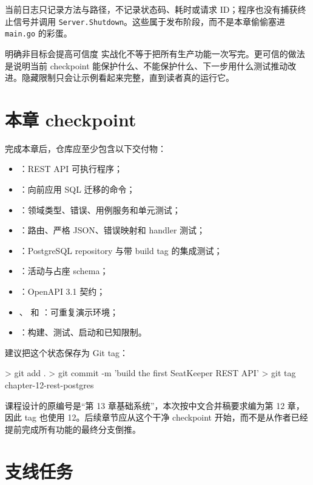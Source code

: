 当前日志只记录方法与路径，不记录状态码、耗时或请求 ID；程序也没有捕获终止信号并调用 \texttt{Server.Shutdown}。这些属于发布阶段，而不是本章偷偷塞进 \texttt{main.go} 的彩蛋。

\begin{tipbox}{明确非目标会提高可信度}
实战化不等于把所有生产功能一次写完。更可信的做法是说明当前 checkpoint 能保护什么、不能保护什么、下一步用什么测试推动改进。隐藏限制只会让示例看起来完整，直到读者真的运行它。
\end{tipbox}

\section{本章 checkpoint}

完成本章后，仓库应至少包含以下交付物：

\begin{itemize}
  \item {}：REST API 可执行程序；
  \item {}：向前应用 SQL 迁移的命令；
  \item {}：领域类型、错误、用例服务和单元测试；
  \item {}：路由、严格 JSON、错误映射和 handler 测试；
  \item {}：PostgreSQL repository 与带 build tag 的集成测试；
  \item {}：活动与占座 schema；
  \item {}：OpenAPI 3.1 契约；
  \item {}、 和 ：可重复演示环境；
  \item {}：构建、测试、启动和已知限制。
\end{itemize}

建议把这个状态保存为 Git tag：

\begin{shellcode}[]
> git add .
> git commit -m 'build the first SeatKeeper REST API'
> git tag chapter-12-rest-postgres
\end{shellcode}
\color{PocketInk}

课程设计的原编号是“第 13 章基础系统”，本次按中文合并稿要求编为第 12 章，因此 tag 也使用 12。后续章节应从这个干净 checkpoint 开始，而不是从作者已经提前完成所有功能的最终分支倒推。

\section{支线任务}

